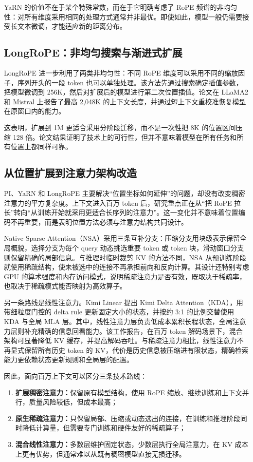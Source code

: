 \documentclass[UTF8,10pt,a4paper,fontset=none]{ctexart}
\newcommand{\key}[1]{\textbf{\color{navy}#1}}
\begin{document}
YaRN 的价值不在于某个特殊常数，而在于它明确考虑了 RoPE 频谱的非均匀性：对所有维度采用相同的处理方式通常并非最优。即使如此，模型一般仍需要接受长文本微调，才能适应新的距离分布。

\subsection{LongRoPE：非均匀搜索与渐进式扩展}
LongRoPE 进一步利用了两类非均匀性：不同 RoPE 维度可以采用不同的缩放因子，序列开头的一段 token 也可以单独处理。该方法先通过搜索确定插值参数，把模型微调到 256K，然后对扩展后的模型进行第二次位置插值。论文在 LLaMA2 和 Mistral 上报告了最高 2,048K 的上下文长度，并通过短上下文重校准恢复模型在原窗口内的能力\cite{ding2024longrope}。

这表明，扩展到 1M 更适合采用分阶段迁移，而不是一次性把 8K 的位置区间压缩 128 倍。论文结果证明了技术上的可行性，但并不意味着模型在所有任务和所有位置上都同样可靠。

\subsection{从位置扩展到注意力架构改造}
PI、YaRN 和 LongRoPE 主要解决“位置坐标如何延伸”的问题，却没有改变稠密注意力的平方复杂度。上下文进入百万 token 后，研究重点正在从“把 RoPE 拉长”转向“从训练开始就采用更适合长序列的注意力”。这一变化并不意味着位置编码不再重要，而是表明位置方法必须与注意力结构共同设计。

Native Sparse Attention（NSA）采用三条互补分支：压缩分支用块级表示保留全局概貌，选择分支为每个 query 动态挑选重要 token 或 token 块，滑动窗口分支则保留精确的局部信息\cite{yuan2025nsa}。与推理时临时裁剪 KV 的方法不同，NSA 从预训练阶段就使用稀疏结构，使未被选中的连接不再承担前向和反向计算。其设计还特别考虑 GPU 的算术强度和内存访问模式，说明稀疏注意力是否有效，既取决于稀疏率，也取决于稀疏模式能否映射为高效算子。

另一条路线是线性注意力。Kimi Linear 提出 Kimi Delta Attention（KDA），用带细粒度门控的 delta rule 更新固定大小的状态，并按约 3:1 的比例交替使用 KDA 与全局 MLA 层\cite{kimiLinear}。其中，线性注意力层负责低成本累积长程状态，全局注意力层则补充精确的信息回看能力。该工作报告，在百万 token 解码场景下，混合架构可显著降低 KV 缓存，并提高解码吞吐。与稀疏注意力相比，线性注意力不再显式保留所有历史 token 的 KV，代价是历史信息被压缩进有限状态，精确检索能力更依赖状态更新规则和全局层的配置。

因此，面向百万上下文可以区分三条技术路线：
\begin{enumerate}
\item \key{扩展稠密注意力：}保留原有模型结构，使用 RoPE 缩放、继续训练和上下文并行，质量风险较低，但成本最高；
\item \key{原生稀疏注意力：}只保留局部、压缩或动态选出的连接，在训练和推理阶段同时降低计算量，但需要专门训练和硬件友好的稀疏算子；
\item \key{混合线性注意力：}多数层维护固定状态，少数层执行全局注意力，在 KV 成本上更有优势，但通常难以从既有稠密模型直接无损迁移。
\end{enumerate}
\end{document}
